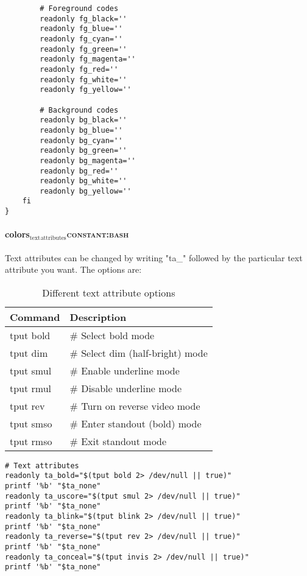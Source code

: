 \documentclass[11pt]{article}
\begin{document}
\begin{verbatim}
        # Foreground codes
        readonly fg_black=''
        readonly fg_blue=''
        readonly fg_cyan=''
        readonly fg_green=''
        readonly fg_magenta=''
        readonly fg_red=''
        readonly fg_white=''
        readonly fg_yellow=''

        # Background codes
        readonly bg_black=''
        readonly bg_blue=''
        readonly bg_cyan=''
        readonly bg_green=''
        readonly bg_magenta=''
        readonly bg_red=''
        readonly bg_white=''
        readonly bg_yellow=''
    fi
}
\end{verbatim}

\paragraph{colors\(_{\text{text}}\)\(_{\text{attributes}}\)\hfill{}\textsc{constant:bash}}
\label{sec:org0edff00}

Text attributes can be changed by writing "ta\_" followed by the particular text attribute you want. The options are:

\begin{table}[htbp]
\caption{Different text attribute options}
\centering
\begin{tabular}{ll}
\hline
Command & Description\\
\hline
tput bold & \# Select bold mode\\
tput dim & \# Select dim (half-bright) mode\\
tput smul & \# Enable underline mode\\
tput rmul & \# Disable underline mode\\
tput rev & \# Turn on reverse video mode\\
tput smso & \# Enter standout (bold) mode\\
tput rmso & \# Exit standout mode\\
\hline
\end{tabular}
\end{table}

\begin{verbatim}
# Text attributes
readonly ta_bold="$(tput bold 2> /dev/null || true)"
printf '%b' "$ta_none"
readonly ta_uscore="$(tput smul 2> /dev/null || true)"
printf '%b' "$ta_none"
readonly ta_blink="$(tput blink 2> /dev/null || true)"
printf '%b' "$ta_none"
readonly ta_reverse="$(tput rev 2> /dev/null || true)"
printf '%b' "$ta_none"
readonly ta_conceal="$(tput invis 2> /dev/null || true)"
printf '%b' "$ta_none"
\end{verbatim}
\end{document}
